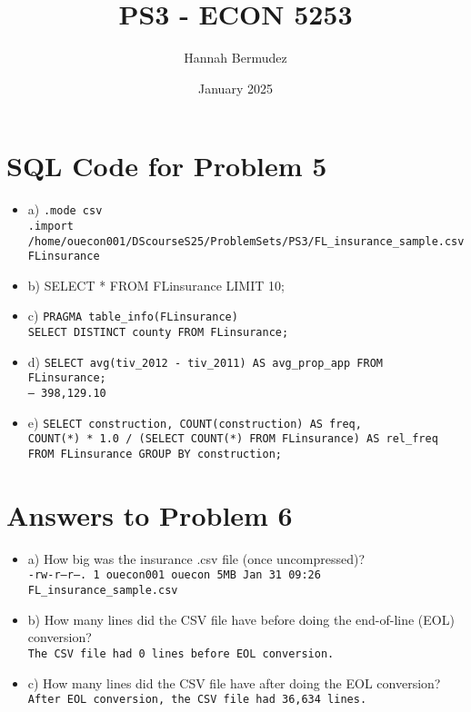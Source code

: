 \documentclass{article}
\title{PS3 - ECON 5253}
\author{Hannah Bermudez}
\date{January 2025}
\begin{document}
\maketitle

\section{SQL Code for Problem 5}
\begin{itemize}
    \item a) \texttt{.mode csv} \\
          \texttt{.import /home/ouecon001/DScourseS25/ProblemSets/PS3/FL\_insurance\_sample.csv \space FLinsurance}
    \item b) SELECT * FROM FLinsurance LIMIT 10;
    \item c) \texttt{PRAGMA table\_info(FLinsurance)} \\
          \texttt{SELECT DISTINCT county FROM FLinsurance;}
    \item d) \texttt{SELECT avg(tiv\_2012 - tiv\_2011) AS avg\_prop\_app FROM FLinsurance;} \\ 
          \texttt{-- 398,129.10}
    \item e) \texttt{SELECT construction, COUNT(construction) AS freq,} \\
          \texttt{COUNT(*) * 1.0 / (SELECT COUNT(*) FROM FLinsurance) AS rel\_freq} \\
          \texttt{FROM FLinsurance GROUP BY construction;}
\end{itemize}

\section{Answers to Problem 6}
\begin{itemize}
    \item a) How big was the insurance .csv file (once uncompressed)? \\ 
          \texttt{-rw-r--r--. 1 ouecon001 ouecon 5MB Jan 31 09:26 FL\_insurance\_sample.csv}
    \item b) How many lines did the CSV file have before doing the end-of-line (EOL) conversion? \\
        \texttt{The CSV file had 0 lines before EOL conversion.}
    \item c) How many lines did the CSV file have after doing the EOL conversion? \\
        \texttt{After EOL conversion, the CSV file had 36,634 lines.}
\end{itemize}
\end{document}

